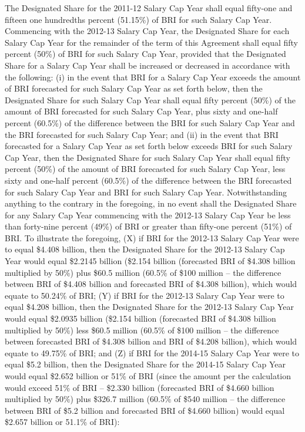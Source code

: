 \documentclass[
]{book}
\begin{document}
\begin{enumerate}
\begin{enumerate}
    The Designated Share for the 2011-12 Salary Cap Year shall equal fifty-one and fifteen one hundredths percent (51.15\%) of BRI for such Salary Cap Year. Commencing with the 2012-13 Salary Cap Year, the Designated Share for each Salary Cap Year for the remainder of the term of this Agreement shall equal fifty percent (50\%) of BRI for such Salary Cap Year, provided that the Designated Share for a Salary Cap Year shall be increased or decreased in accordance with the following: (i) in the event that BRI for a Salary Cap Year exceeds the amount of BRI forecasted for such Salary Cap Year as set forth below, then the Designated Share for such Salary Cap Year shall equal fifty percent (50\%) of the amount of BRI forecasted for such Salary Cap Year, plus sixty and one-half percent (60.5\%) of the difference between the BRI for such Salary Cap Year and the BRI forecasted for such Salary Cap Year; and (ii) in the event that BRI forecasted for a Salary Cap Year as set forth below exceeds BRI for such Salary Cap Year, then the Designated Share for such Salary Cap Year shall equal fifty percent (50\%) of the amount of BRI forecasted for such Salary Cap Year, less sixty and one-half percent (60.5\%) of the difference between the BRI forecasted for such Salary Cap Year and BRI for such Salary Cap Year. Notwithstanding anything to the contrary in the foregoing, in no event shall the Designated Share for any Salary Cap Year commencing with the 2012-13 Salary Cap Year be less than forty-nine percent (49\%) of BRI or greater than fifty-one percent (51\%) of BRI. To illustrate the foregoing, (X) if BRI for the 2012-13 Salary Cap Year were to equal \$4.408 billion, then the Designated Share for the 2012-13 Salary Cap Year would equal \$2.2145 billion (\$2.154 billion (forecasted BRI of \$4.308 billion multiplied by 50\%) plus \$60.5 million (60.5\% of \$100 million -- the difference between BRI of \$4.408 billion and forecasted BRI of \$4.308 billion), which would equate to 50.24\% of BRI; (Y) if BRI for the 2012-13 Salary Cap Year were to equal \$4.208 billion, then the Designated Share for the 2012-13 Salary Cap Year would equal \$2.0935 billion (\$2.154 billion (forecasted BRI of \$4.308 billion multiplied by 50\%) less \$60.5 million (60.5\% of \$100 million -- the difference between forecasted BRI of \$4.308 billion and BRI of \$4.208 billion), which would equate to 49.75\% of BRI; and (Z) if BRI for the 2014-15 Salary Cap Year were to equal \$5.2 billion, then the Designated Share for the 2014-15 Salary Cap Year would equal \$2.652 billion or 51\% of BRI (since the amount per the calculation would exceed 51\% of BRI -- \$2.330 billion (forecasted BRI of \$4.660 billion multiplied by 50\%) plus \$326.7 million (60.5\% of \$540 million -- the difference between BRI of \$5.2 billion and forecasted BRI of \$4.660 billion) would equal \$2.657 billion or 51.1\% of BRI):
  \end{enumerate}


\end{enumerate}
\end{document}
